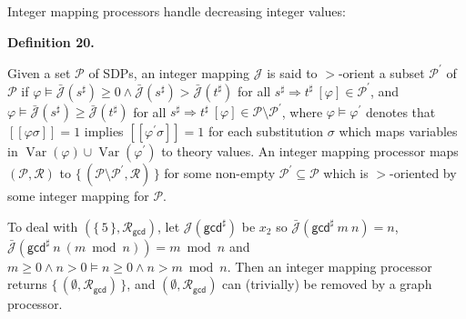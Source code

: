 \documentclass[10pt,a4paper]{amsart}
\begin{document}
 
 
 
Integer mapping processors handle decreasing integer values:\par
 
 
 
\par\medskip\noindent\textbf{Definition 20.}\par
 
 
Given a set $\mathcal{P}$ of SDPs, an integer mapping $\mathcal{J}$ is said to $>$-orient a subset $\mathcal{P}^{\prime}$ of $\mathcal{P}$ if $\varphi\models\bar{\mathcal{J}}(s^{\sharp})\geq 0\wedge\bar{\mathcal{J}}(s^{\sharp})>\bar{\mathcal{J}}(t^{\sharp})$ for all ${s^{\sharp}}\Rightarrow{t^{\sharp}}\ [\varphi]\in\mathcal{P}^{\prime}$, and $\varphi\models\bar{\mathcal{J}}(s^{\sharp})\geq\bar{\mathcal{J}}(t^{\sharp})$ for all ${s^{\sharp}}\Rightarrow{t^{\sharp}}\ [\varphi]\in\mathcal{P}\setminus\mathcal{P}^{\prime}$, where $\varphi\models\varphi^{\prime}$ denotes that $[\![\varphi\sigma]\!]=1$ implies $[\![\varphi^{\prime}\sigma]\!]=1$ for each substitution $\sigma$ which maps variables in $\operatorname{Var}(\varphi)\cup\operatorname{Var}(\varphi^{\prime})$ to theory values. An integer mapping processor maps $(\mathcal{P},\mathcal{R})$ to $\{\,(\mathcal{P}\setminus\mathcal{P}^{\prime},\mathcal{R})\,\}$ for some non-empty $\mathcal{P}^{\prime}\subseteq\mathcal{P}$ which is $>$-oriented by some integer mapping for $\mathcal{P}$.\par
 
 
 
 
To deal with $(\{\,\text{5}\,\},\mathcal{R}_{\mathsf{gcd}})$, let $\mathcal{J}(\mathsf{gcd}^{\sharp})$ be $x_{2}$ so $\bar{\mathcal{J}}({{\mathsf{gcd}^{\sharp}}\ {m}}\ {n})=n$, $\bar{\mathcal{J}}({{\mathsf{gcd}^{\sharp}}\ {n}}\ {(m\bmod n)})=m\bmod n$ and $m\geq 0\wedge n>0\models n\geq 0\wedge n>m\bmod n$. Then an integer mapping processor returns $\{\,(\emptyset,\mathcal{R}_{\mathsf{gcd}})\,\}$, and $(\emptyset,\mathcal{R}_{\mathsf{gcd}})$ can (trivially) be removed by a graph processor.\par
 
 
\end{document}
